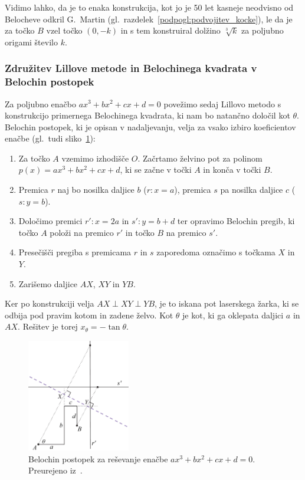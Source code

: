 Vidimo lahko, da je to enaka konstrukcija, kot jo je 50 let kasneje neodvisno od Belocheve odkril G.\ Martin (gl.\ razdelek~\ref{podpogl:podvojitev_kocke}), le da je za točko $B$ vzel točko $(0, -k)$ in s tem konstruiral dolžino $\sqrt[3]{k}$ za poljubno origami število $k$.

\subsubsection*{Združitev Lillove metode in Belochinega kvadrata v Belochin postopek}
\label{podpogl:lill_beloch_postopek}

Za poljubno enačbo $a x^3 + b x^2 + c x + d = 0$ povežimo sedaj Lillovo metodo s konstrukcijo primernega Belochinega kvadrata, ki nam bo natančno določil kot $\theta$. Belochin postopek, ki je opisan v nadaljevanju, velja za vsako izbiro koeficientov enačbe (gl.\ tudi sliko~\ref{fig:beloch_kubicna_resitev}):

\begin{enumerate}
    \item Za točko $A$ vzemimo izhodišče $O$. Začrtamo želvino pot za polinom $p(x) = a x^3 + b x^2 + c x + d$, ki se začne v točki $A$ in konča v točki $B$.
    \item Premica $r$ naj bo nosilka daljice $b$ ($r: x = a$), premica $s$ pa nosilka daljice $c$ ($s: y = b$).
    \item Določimo premici $r': x = 2a$ in $s': y = b + d$ ter opravimo Belochin pregib, ki točko $A$ položi na premico $r'$ in točko $B$ na premico $s'$.
    \item Presečišči pregiba s premicama $r$ in $s$ zaporedoma označimo s točkama $X$ in $Y$.
    \item Zarišemo daljice $AX$, $XY$ in $YB$.
\end{enumerate}

Ker po konstrukciji velja $ AX \perp XY \perp YB $, je to iskana pot laserskega žarka, ki se odbija pod pravim kotom in zadene želvo. Kot $\theta$ je kot, ki ga oklepata daljici $a$ in $AX$. Rešitev je torej $x_{\theta} = - \tan \theta$.

\begin{figure}[h]
    \centering
    \includegraphics[width=0.4\textwidth]{images/kubična enačba/beloch_kubicna_resitev.png}
    \caption[Lillova metoda z Belochinim kvadratom]{Belochin postopek za reševanje enačbe $a x^3 + b x^2 + c x + d = 0$. Preurejeno iz~\cite[str.\ 42]{hull2020}.}
    \label{fig:beloch_kubicna_resitev}
\end{figure}

